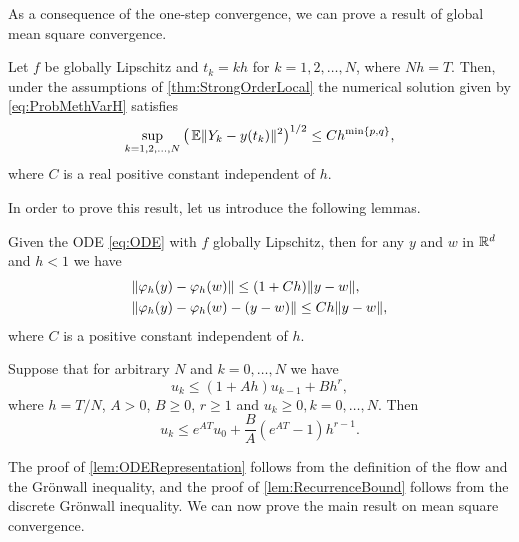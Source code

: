 \documentclass[10pt]{article}
\begin{document}
As a consequence of the one-step convergence, we can prove a result of global mean square convergence.
\begin{theorem}\label{thm:StrongOrder} Let $f$ be globally Lipschitz and $t_k = kh$ for $k = 1, 2, \ldots, N$, where $Nh = T$. Then, under the assumptions of \cref{thm:StrongOrderLocal} the numerical solution given by \eqref{eq:ProbMethVarH} satisfies 
	\begin{equation}\label{eq:StrongGlobalClaim}
		\sup_{k=1,2, \ldots, N} \big(\operatorname{\mathbb{E}}\lVert Y_k - y(t_k)\rVert^2\big)^{1/2} \leq C h^{\min\{p, q\}},
	\end{equation}
	where $C$ is a real positive constant independent of $h$.
\end{theorem}
In order to prove this result, let us introduce the following lemmas.
\begin{lemma}\label{lem:ODERepresentation} Given the ODE \eqref{eq:ODE} with $f$ globally Lipschitz, then for any $y$ and $w$ in $\mathbb{R}^d$ and $h < 1$ we have
	\begin{align}
		&\lVert\varphi_h(y) - \varphi_h(w)\rVert \leq (1 + Ch) \lVert y - w\rVert,\\
		&\lVert\varphi_h(y) - \varphi_h(w) - (y - w)\rVert \leq Ch\lVert y - w\rVert,
	\end{align}
	where $C$ is a positive constant independent of $h$.
\end{lemma}
\begin{lemma}\label{lem:RecurrenceBound} Suppose that for arbitrary $N$ and $k = 0, \ldots, N$ we have
	\begin{equation}
		u_{k} \leq (1 + Ah) u_{k-1} + Bh^r,
	\end{equation}
	where $h = T / N$, $A > 0$, $B \geq 0$, $r \geq 1$ and $u_k \geq 0, k = 0, \ldots, N$. Then
	\begin{equation}
		u_k \leq e^{AT}u_0 + \frac{B}{A}(e^{AT} - 1) h^{r-1}.
	\end{equation}
\end{lemma}
The proof of \cref{lem:ODERepresentation} follows from the definition of the flow and the Grönwall inequality, and the proof of \cref{lem:RecurrenceBound} follows from the discrete Grönwall inequality. We can now prove the main result on mean square convergence.
\end{document}
